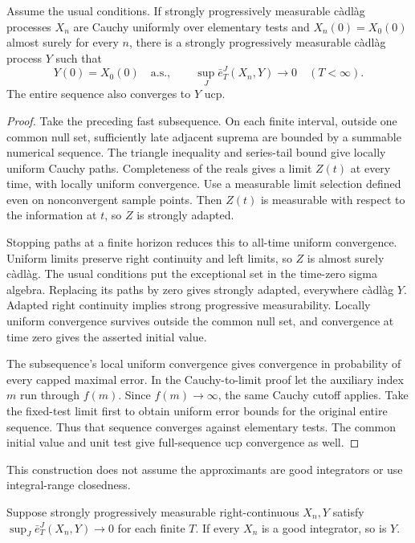 \begin{proposition}
Assume the usual conditions. If strongly progressively measurable
c\`adl\`ag processes $X_n$ are Cauchy uniformly over elementary tests and $X_n(0)=X_0(0)$ almost surely for every $n$, there is a
strongly progressively measurable c\`adl\`ag process $Y$ such that
\[
 Y(0)=X_0(0)\quad\text{a.s.},\qquad
 \sup_J\bar e_T^J(X_n,Y)\longrightarrow0\quad(T<\infty).
\]
The entire sequence also converges to $Y$ ucp.
\end{proposition}
\begin{proof}
Take the preceding fast subsequence. On each finite interval, outside one
common null set, sufficiently late adjacent suprema are bounded by a
summable numerical sequence. The triangle inequality and series-tail
bound give locally uniform Cauchy paths. Completeness of the reals gives
a limit $Z(t)$ at every time, with locally uniform convergence.
Use a measurable limit selection defined even on nonconvergent sample
points. Then $Z(t)$ is measurable with respect to the information at $t$,
so $Z$ is strongly adapted.

Stopping paths at a finite horizon reduces this to all-time uniform
convergence. Uniform limits preserve right continuity and left limits,
so $Z$ is almost surely c\`adl\`ag. The usual conditions put the exceptional
set in the time-zero sigma algebra. Replacing its paths by zero gives
strongly adapted, everywhere c\`adl\`ag $Y$. Adapted right continuity
implies strong progressive measurability. Locally uniform convergence
survives outside the common null set, and convergence at time zero gives
the asserted initial value.

The subsequence's local uniform convergence gives convergence in probability
of every capped maximal error. In the Cauchy-to-limit proof let the
auxiliary index $m$ run through $f(m)$. Since $f(m)\to\infty$, the same
Cauchy cutoff applies. Take the fixed-test limit first to obtain uniform
error bounds for the original entire sequence. Thus that sequence
converges against elementary tests. The common initial value and unit
test give full-sequence ucp convergence as well.
\end{proof}
This construction does not assume the approximants are good integrators or
use integral-range closedness.
\begin{proposition}\label{prop:gi-limit}
Suppose strongly progressively measurable right-continuous $X_n,Y$ satisfy
$\sup_J\bar e_T^J(X_n,Y)\to0$ for each finite $T$. If every $X_n$ is a good
integrator, so is $Y$.
\end{proposition}

